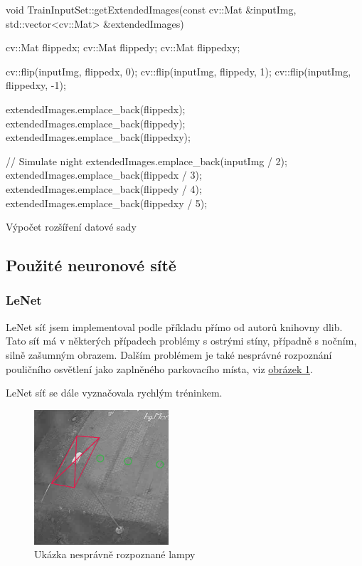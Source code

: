 \documentclass[10pt,a4paper, table]{article}
\begin{document}
\begin{listing}[ht]
\begin{c++code}
void TrainInputSet::getExtendedImages(const cv::Mat &inputImg,
std::vector<cv::Mat> &extendedImages) {
    cv::Mat flippedx;
    cv::Mat flippedy;
    cv::Mat flippedxy;

    cv::flip(inputImg, flippedx, 0);
    cv::flip(inputImg, flippedy, 1);
    cv::flip(inputImg, flippedxy, -1);

    extendedImages.emplace_back(flippedx);
    extendedImages.emplace_back(flippedy);
    extendedImages.emplace_back(flippedxy);

    // Simulate night
    extendedImages.emplace_back(inputImg / 2);
    extendedImages.emplace_back(flippedx / 3);
    extendedImages.emplace_back(flippedy / 4);
    extendedImages.emplace_back(flippedxy / 5);
  }
\end{c++code}
\caption{Výpočet rozšíření datové sady}
\label{lst:extendedImagesAlgo}
\end{listing}

\subsection{Použité neuronové sítě}
\subsubsection{LeNet}
LeNet síť jsem implementoval podle příkladu přímo od autorů knihovny dlib. Tato síť má v některých případech problémy s ostrými stíny, případně s nočním, silně zašumným obrazem. Dalším problémem je také nesprávné rozpoznání pouličního osvětlení jako zaplněného parkovacího místa, viz \hyperref[fig:dementniLampa]{obrázek \ref{fig:dementniLampa}}.\par
LeNet síť se dále vyznačovala rychlým tréninkem.

\begin{figure}[h]
  \centering
  \includegraphics[width=5cm]{images/dementniLampa.png}
  \caption{Ukázka nesprávně rozpoznané lampy}%
  \label{fig:dementniLampa}%
\end{figure}
\end{document}

